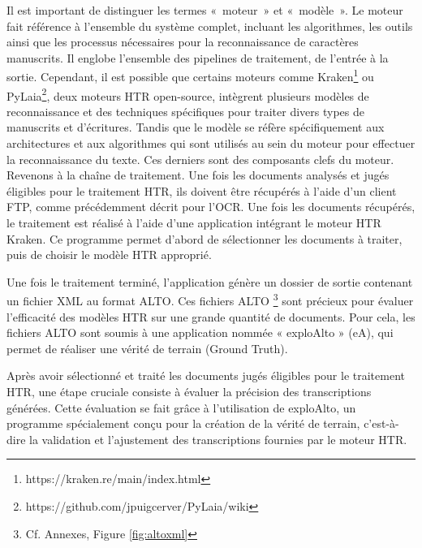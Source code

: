 \documentclass[a4paper,12pt,twoside]{book}
\begin{document}
	Il est important de distinguer les termes « moteur » et « modèle ». Le moteur fait référence à l’ensemble du système complet, incluant les algorithmes, les outils ainsi que les processus nécessaires pour la reconnaissance de caractères manuscrits. Il englobe l’ensemble des pipelines de traitement, de l’entrée à la sortie. Cependant, il est possible que certains moteurs comme Kraken\footnote{ https://kraken.re/main/index.html} ou PyLaia\footnote{ https://github.com/jpuigcerver/PyLaia/wiki}, deux moteurs HTR open-source, intègrent plusieurs modèles de reconnaissance et des techniques spécifiques pour traiter divers types de manuscrits et d’écritures. Tandis que le modèle se réfère spécifiquement aux architectures et aux algorithmes qui sont utilisés au sein du moteur pour effectuer la reconnaissance du texte. Ces derniers sont des composants clefs du moteur. 
	\\
	
	Revenons à la chaîne de traitement. Une fois les documents analysés et jugés éligibles pour le traitement HTR, ils doivent être récupérés à l'aide d'un client FTP, comme précédemment décrit pour l'OCR. Une fois les documents récupérés, le traitement est réalisé à l'aide d'une application intégrant le moteur HTR Kraken. Ce programme permet d'abord de sélectionner les documents à traiter, puis de choisir le modèle HTR approprié. 
	
	Une fois le traitement terminé, l'application génère un dossier de sortie contenant un fichier XML au format ALTO. Ces fichiers ALTO \footnote{Cf. Annexes, Figure \ref{fig:altoxml}} sont précieux pour évaluer l'efficacité des modèles HTR sur une grande quantité de documents. Pour cela, les fichiers ALTO sont soumis à une application nommée « exploAlto » (eA), qui permet de réaliser une vérité de terrain (Ground Truth).
	
	Après avoir sélectionné et traité les documents jugés éligibles pour le traitement HTR, une étape cruciale consiste à évaluer la précision des transcriptions générées. Cette évaluation se fait grâce à l’utilisation de exploAlto, un programme spécialement conçu pour la création de la vérité de terrain, c’est-à-dire la validation et l’ajustement des transcriptions fournies par le moteur HTR.
	\\
	
\end{document}
